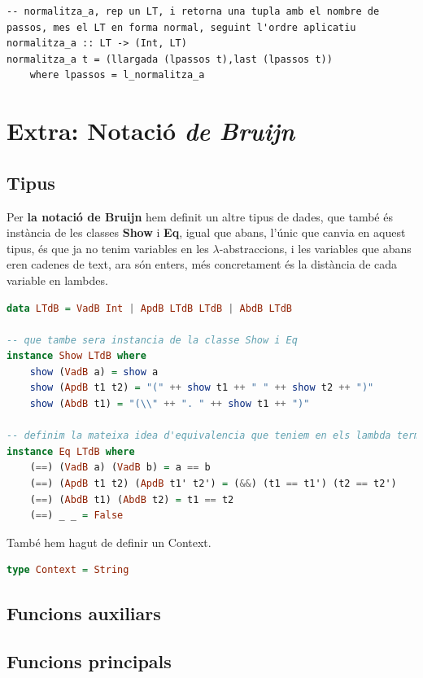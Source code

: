 \documentclass[10pt,a4paper]{article}
\begin{document}
\lstset{language=Haskell, breaklines=true, basicstyle=\footnotesize}
\begin{lstlisting}[frame=mystyle]
-- normalitza_a, rep un LT, i retorna una tupla amb el nombre de passos, mes el LT en forma normal, seguint l'ordre aplicatiu
normalitza_a :: LT -> (Int, LT)
normalitza_a t = (llargada (lpassos t),last (lpassos t))
    where lpassos = l_normalitza_a
\end{lstlisting}

\clearpage

\section{Extra: Notació \textit{de Bruijn}}

\subsection{Tipus}

Per \textbf{la notació de Bruijn} hem definit un altre tipus de dades, que també és instància de les classes \textbf{Show} i \textbf{Eq}, igual que abans, l'únic que canvia en aquest tipus, és que ja no tenim variables en les $\lambda$-abstraccions, i les variables que abans eren cadenes de text, ara són enters, més concretament és la distància de cada variable en lambdes.

\begin{lstlisting}[language=Haskell]
data LTdB = VadB Int | ApdB LTdB LTdB | AbdB LTdB

-- que tambe sera instancia de la classe Show i Eq
instance Show LTdB where
    show (VadB a) = show a
    show (ApdB t1 t2) = "(" ++ show t1 ++ " " ++ show t2 ++ ")"
    show (AbdB t1) = "(\\" ++ ". " ++ show t1 ++ ")"

-- definim la mateixa idea d'equivalencia que teniem en els lambda termes pels lambda termes amb notacio de Bruijn
instance Eq LTdB where
    (==) (VadB a) (VadB b) = a == b
    (==) (ApdB t1 t2) (ApdB t1' t2') = (&&) (t1 == t1') (t2 == t2')
    (==) (AbdB t1) (AbdB t2) = t1 == t2
    (==) _ _ = False
\end{lstlisting}

També hem hagut de definir un Context.

\begin{lstlisting}[language=Haskell]
type Context = String
\end{lstlisting}

\clearpage

\subsection{Funcions auxiliars}

\clearpage

\subsection{Funcions principals}
\end{document}
